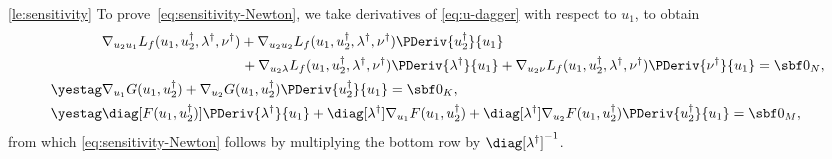 \documentclass[11pt]{article}
\begin{document}
\begin{proof-lemma}{\ref{le:sensitivity}}
  To prove~\eqref{eq:sensitivity-Newton}, we take derivatives of
  \eqref{eq:u-dagger} with respect to $u_1$, to obtain
  \begin{align*}
    &\nabla_{u_2u_1} L_f(u_1,u_2^\dagger,\lambda^\dagger,\nu^\dagger)
    +\nabla_{u_2u_2} L_f(u_1,u_2^\dagger,\lambda^\dagger,\nu^\dagger)\PDeriv{u_2^\dagger}{u_1}\\&\hspace*{10em}
    +\nabla_{u_2\lambda} L_f(u_1,u_2^\dagger,\lambda^\dagger,\nu^\dagger)\PDeriv{\lambda^\dagger}{u_1}
    +\nabla_{u_2\nu} L_f(u_1,u_2^\dagger,\lambda^\dagger,\nu^\dagger)\PDeriv{\nu^\dagger}{u_1}
    =\sbf 0_{N}, \\
    \yestag\label{eq:G-dagger}
    &\nabla_{u_1} G(u_1,u_2^\dagger)+\nabla_{u_2} G(u_1,u_2^\dagger)\PDeriv{u_2^\dagger}{u_1}
    =\sbf 0_{K}, \\
    \yestag\label{eq:F-dagger}
    &
    \diag[F(u_1,u_2^\dagger)]\PDeriv{\lambda^\dagger}{u_1}
    +
    \diag[\lambda^\dagger] \nabla_{u_1} F(u_1,u_2^\dagger)
    +\diag[\lambda^\dagger] \nabla_{u_2} F(u_1,u_2^\dagger)\PDeriv{u_2^\dagger}{u_1}
    =\sbf 0_{M},
  \end{align*}
  from which \eqref{eq:sensitivity-Newton} follows by multiplying the
  bottom row by $\diag[\lambda^\dagger]^{-1}$.

  \medskip


\end{proof-lemma}
\end{document}
